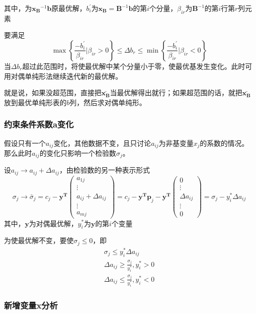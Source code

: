 \documentclass{book}
\begin{document}
其中，为$\boldsymbol{x_B}^{-1}\boldsymbol{b}$原最优解，$b_i^{\prime}$为$\boldsymbol{x_B}=\boldsymbol{B}^{-1}\boldsymbol{b}$的第$i$个分量，$\beta_{ir}$为$\boldsymbol{B}^{-1}$的第$i$行第$r$列元素

要满足$$\max\left\{ \frac{-b_i^{\prime}}{\beta_{ir}}|\beta_{ir}>0 \right\}\le\Delta b_r\le\min\left\{ \frac{-b_i^{\prime}}{\beta_{ir}}|\beta_{ir}<0 \right\}$$当$\Delta b_r$超过此范围时，将使最优解中某个分量小于零，使最优基发生变化。此时可用对偶单纯形法继续迭代新的最优解。

就是说，如果没超范围，直接把$\boldsymbol{\bar{x_B}}$当最优解得出就行；如果超范围的话，就把$\boldsymbol{\bar{x_B}}$放到最优单纯形表的$b$列，然后求对偶单纯形。

\subsubsection{约束条件系数a变化}
假设只有一个$a_{ij}$变化，其他数据不变，且只讨论$a_{ij}$为非基变量$x_j$的系数的情况。那么此时$a_{ij}$的变化只影响一个检验数$\sigma_j$。

设$a_{ij}\rightarrow a_{ij}+\Delta a_{ij}$，由检验数的另一种表示形式$$\sigma_j\rightarrow\bar{\sigma}_j=c_j-\boldsymbol{y^T}
\begin{pmatrix}a_{1j}\\ \vdots\\ a_{ij}+\Delta a_{ij}\\ \vdots\\ a_{mj}\end{pmatrix}=c_j-\boldsymbol{y^Tp}_j-\boldsymbol{y^T}\begin{pmatrix}0\\ \vdots\\ \Delta a_{ij}\\ \vdots\\ 0 \end{pmatrix}=\sigma_j-y_i^*\Delta a_{ij}$$其中，$\boldsymbol{y}$为对偶最优解，$y_i^*$为$\boldsymbol{y}$的第$i$个变量

为使最优解不变，要使$\sigma_j\le0$，即\begin{align*}
    \sigma_j\le y_i^*\Delta a_{ij}\\
    \Delta a_{ij}\ge\frac{\sigma_j}{y_i^*},y^*_i>0\\
    \Delta a_{ij}\le\frac{\sigma_j}{y^*_i},y^*_i<0
\end{align*}

\subsubsection{新增变量x分析}
\end{document}
